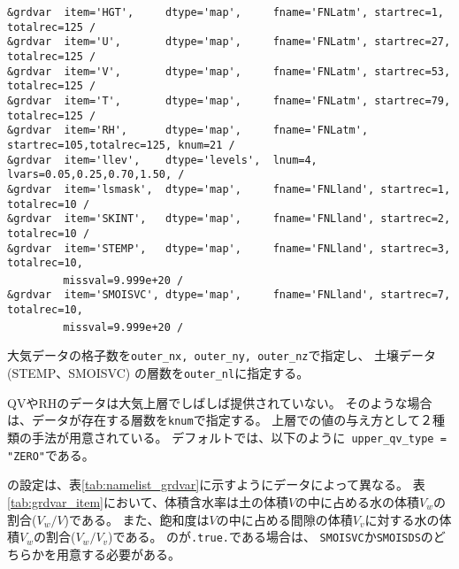 {\verb|&grdvar  item='HGT',     dtype='map',     fname='FNLatm', startrec=1,  totalrec=125 / |  \\
\verb|&grdvar  item='U',       dtype='map',     fname='FNLatm', startrec=27, totalrec=125 / |  \\
\verb|&grdvar  item='V',       dtype='map',     fname='FNLatm', startrec=53, totalrec=125 / |  \\
\verb|&grdvar  item='T',       dtype='map',     fname='FNLatm', startrec=79, totalrec=125 / |  \\
\verb|&grdvar  item='RH',      dtype='map',     fname='FNLatm', startrec=105,totalrec=125, knum=21 /  |  \\
\verb|&grdvar  item='llev',    dtype='levels',  lnum=4, lvars=0.05,0.25,0.70,1.50, /        |  \\
\verb|&grdvar  item='lsmask',  dtype='map',     fname='FNLland', startrec=1, totalrec=10 /  |  \\
\verb|&grdvar  item='SKINT',   dtype='map',     fname='FNLland', startrec=2, totalrec=10 /  |  \\
\verb|&grdvar  item='STEMP',   dtype='map',     fname='FNLland', startrec=3, totalrec=10,|\\
~~~~~~~~\verb| missval=9.999e+20 /|  \\
\verb|&grdvar  item='SMOISVC', dtype='map',     fname='FNLland', startrec=7, totalrec=10,|\\
~~~~~~~~\verb| missval=9.999e+20 /|  \\
}

大気データの格子数を\verb|outer_nx, outer_ny, outer_nz|で指定し、
土壌データ(STEMP、SMOISVC) の層数を\verb|outer_nl|に指定する。

QVやRHのデータは大気上層でしばしば提供されていない。
そのような場合は、データが存在する層数を\verb|knum|で指定する。
上層での値の与え方として２種類の手法が用意されている。
デフォルトでは、以下のように\verb| upper_qv_type = "ZERO"|である。\\

の設定は、表\ref{tab:namelist_grdvar}に示すようにデータによって異なる。
表\ref{tab:grdvar_item}において、体積含水率は土の体積$V$の中に占める水の体積$V_w$の割合($V_w / V$)である。
また、飽和度は$V$の中に占める間隙の体積$V_v$に対する水の体積$V_w$の割合($V_w / V_v$)である。
のが\verb|.true.|である場合は、
\verb|SMOISVC|か\verb|SMOISDS|のどちらかを用意する必要がある。

